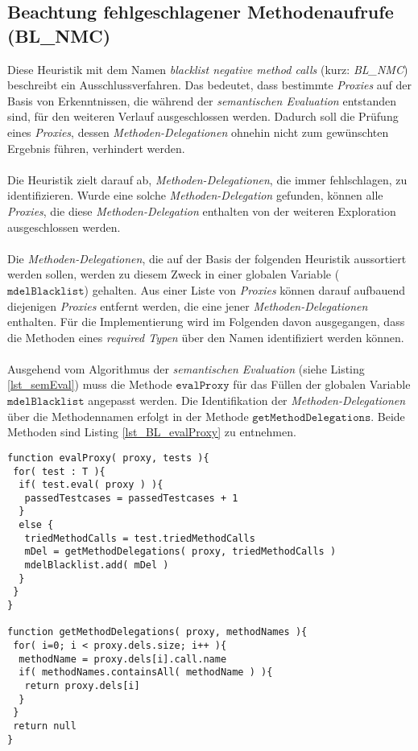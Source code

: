 \subsection{Beachtung fehlgeschlagener Methodenaufrufe (BL\_NMC)}\label{sec_bl_nmc}
Diese \Gls{Heuristik} mit dem Namen \emph{blacklist negative method calls} (kurz: \emph{BL\_NMC}) beschreibt ein Ausschlussverfahren. Das bedeutet, dass bestimmte \emph{Proxies} auf der Basis von Erkenntnissen, die während der \emph{semantischen Evaluation} entstanden sind, für den weiteren Verlauf ausgeschlossen werden. Dadurch soll die Prüfung eines \emph{Proxies}, dessen \emph{Methoden-Delegationen} ohnehin nicht zum gewünschten Ergebnis führen, verhindert werden.
\\\\
Die Heuristik zielt darauf ab, \emph{Methoden-Delegationen}, die immer fehlschlagen, zu identifizieren. Wurde eine solche \emph{Methoden-Delegation} gefunden, können alle \emph{Proxies}, die diese \emph{Methoden-Delegation} enthalten von der weiteren Exploration ausgeschlossen werden.
\\\\
Die \emph{Methoden-Delegationen}, die auf der Basis der folgenden \Gls{Heuristik} aussortiert werden sollen, werden zu diesem Zweck in einer globalen Variable ($\texttt{mdelBlacklist}$) gehalten. Aus einer Liste von \emph{Proxies} können darauf aufbauend diejenigen \emph{Proxies} entfernt werden, die eine jener \emph{Methoden-Delegationen} enthalten. Für die Implementierung wird im Folgenden davon ausgegangen, dass die Methoden eines \emph{required Typen} über den Namen identifiziert werden können.
\\\\
Ausgehend vom Algorithmus der \emph{semantischen Evaluation} (siehe Listing \ref{lst_semEval}) muss die Methode $\texttt{evalProxy}$ für das Füllen der globalen Variable $\texttt{mdelBlacklist}$ angepasst werden. Die Identifikation der \emph{Methoden-Delegationen} über die Methodennamen erfolgt in der Methode $\texttt{getMethodDelegations}$. Beide Methoden sind Listing \ref{lst_BL_evalProxy} zu entnehmen.
\begin{lstlisting}[style = pseudo, caption = Evaluierung einzelner Proxies mit BL\_MNC, captionpos = b, label = lst_BL_evalProxy]
function evalProxy( proxy, tests ){
 for( test : T ){	
  if( test.eval( proxy ) ){
   passedTestcases = passedTestcases + 1
  }
  else {
   triedMethodCalls = test.triedMethodCalls
   mDel = getMethodDelegations( proxy, triedMethodCalls )
   mdelBlacklist.add( mDel )
  }		
 }
}

function getMethodDelegations( proxy, methodNames ){
 for( i=0; i < proxy.dels.size; i++ ){
  methodName = proxy.dels[i].call.name
  if( methodNames.containsAll( methodName ) ){
   return proxy.dels[i]
  }
 }
 return null
}
\end{lstlisting}
